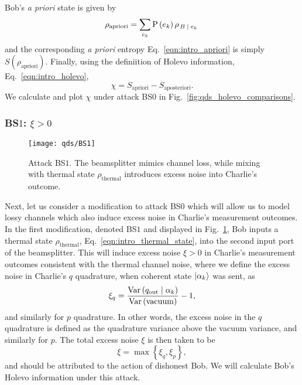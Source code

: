 \noindent Bob's \emph{a priori} state is given by
\begin{equation}\label{eqn:qds_aprioristate}
\rho_{\text{apriori}} = \sum_{e_k} \text{P}\left(e_k\right) \rho_{\left. B \; \middle| \; e_k\right.}
\end{equation}
and the corresponding \emph{a priori} entropy Eq.~\ref{eqn:intro_apriori} is simply $S\left(\rho_{\text{apriori}}\right)$. Finally, using the definiition of Holevo information, Eq.~\ref{eqn:intro_holevo},
\begin{equation}\label{eqn:qds_deriv_holevo}
\chi = S_{\text{apriori}} - S_{\text{aposteriori}}.
\end{equation}
We calculate and plot $\chi$ under attack BS$0$ in Fig.~\ref{fig:qds_holevo_comparisons}. 

\subsubsection{BS$1$: $\xi > 0$}\label{sec:qds_bs1}
\begin{figure}[htp]
\centering
\texttt{[image: qds/BS1]}
\caption{\label{fig:bs1_attack} Attack BS$1$. The beamsplitter mimics channel loss, while mixing with thermal state $\rho_{\text{thermal}}$ introduces excess noise into Charlie's outcome.}
\end{figure}
Next, let us consider a modification to attack BS$0$ which will allow us to model lossy channels which also induce excess noise in Charlie's measurement outcomes. In the first modification, denoted BS$1$ and displayed in Fig.~\ref{fig:bs1_attack}, Bob inputs a thermal state $\rho_{\text{thermal}}$, Eq.~\ref{eqn:intro_thermal_state}, into the second input port of the beamsplitter. This will induce excess noise $\xi > 0$ in Charlie's measurement outcomes consistent with the thermal channel noise,
where we define the excess noise in Charlie's $q$ quadrature, when coherent state $\ket{\alpha_k}$ was sent, as
\begin{equation}
\xi_q = \frac{\text{Var}\left(q_{\text{out}} \; \middle| \; \alpha_k\right)}{\text{Var}\left(\text{vacuum}\right)} - 1,
\end{equation}
and similarly for $p$ quadrature. In other words, the excess noise in the $q$ quadrature is defined as the quadrature variance above the vacuum variance, and similarly for $p$. The total excess noise $\xi$ is then taken to be
\begin{equation}
\xi = \max \left\{ \xi_q, \xi_p\right\},
\end{equation}
and should be attributed to the action of dishonest Bob. We will calculate Bob's Holevo information under this attack.

